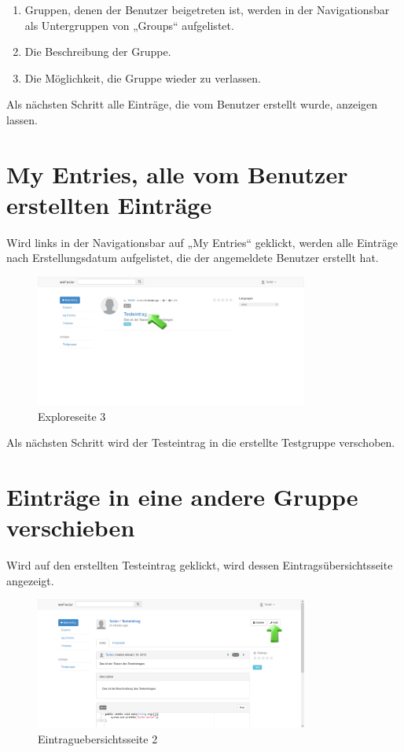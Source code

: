 \begin{enumerate}
\item Gruppen, denen der Benutzer beigetreten ist, werden in der Navigationsbar als Untergruppen von „Groups“ aufgelistet.
\item Die Beschreibung der Gruppe.
\item Die Möglichkeit, die Gruppe wieder zu verlassen.
\end{enumerate}


Als nächsten Schritt alle Einträge, die vom Benutzer erstellt wurde, anzeigen lassen.


\chapter{My Entries, alle vom Benutzer erstellten Einträge}

Wird links in der Navigationsbar auf „My Entries“ geklickt, werden alle Einträge nach Erstellungsdatum aufgelistet, die der angemeldete Benutzer erstellt hat.

\begin{figure}[H]
    \centering
    \includegraphics[width=0.8\textwidth]{Bilder/20.png}
    \caption{Exploreseite 3}
    \label{fig:exploreseite3}
\end{figure}


Als nächsten Schritt wird der Testeintrag in die erstellte Testgruppe verschoben.



\chapter{Einträge in eine andere Gruppe verschieben}

Wird auf den erstellten Testeintrag geklickt, wird dessen Eintragsübersichtsseite angezeigt.

\begin{figure}[H]
    \centering
    \includegraphics[width=0.8\textwidth]{Bilder/21.png}
    \caption{Eintraguebersichtsseite 2}
    \label{fig:eintraguebersichtsseite2}
\end{figure}


